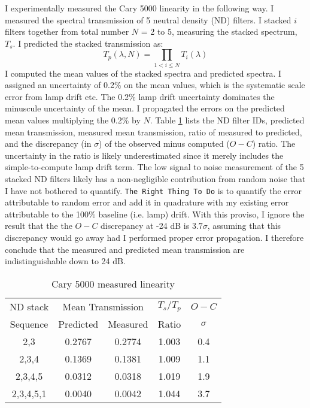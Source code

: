 I experimentally measured the Cary 5000 linearity in the following way.  I measured the spectral transmission of 5 neutral density (ND) filters.  I stacked $i$ filters together from total number $N$ = 2 to 5, measuring the stacked spectrum, $T_s$.  I predicted the stacked transmission as: $$T_{p}(\lambda, N) = \prod_{1< i \leq N} T_{i}(\lambda)$$  I computed the mean values of the stacked spectra and predicted spectra.  I assigned an uncertainty of 0.2\% on the mean values, which is the systematic scale error from lamp drift etc.  The 0.2\% lamp drift uncertainty dominates the minuscule uncertainty of the mean.  I propagated the errors on the predicted mean values multiplying the 0.2\% by $N$.  Table \ref{tab:C5000beam} lists the ND filter IDs, predicted mean transmission, measured mean transmission, ratio of measured to predicted, and the discrepancy (in $\sigma$) of the observed minus computed ($O-C$) ratio.  The uncertainty in the ratio is likely underestimated since it merely includes the simple-to-compute lamp drift term.  The low signal to noise measurement of the 5 stacked ND filters likely has a non-negligible contribution from random noise that I have not bothered to quantify.  \texttt{The Right Thing To Do\texttrademark} is to quantify the error attributable to random error and add it in quadrature with my existing error attributable to the 100\% baseline (i.e. lamp) drift.  With this proviso, I ignore the result that the the $O-C$ discrepancy at -24 dB is $3.7\sigma$, assuming that this discrepancy would go away had I performed proper error propagation.  I therefore conclude that the measured and predicted mean transmission are indistinguishable down to 24 dB.


\begin{longtable}{ccccc}
    \caption[Cary 5000 linearity]{Cary 5000 measured linearity} \label{tab:C5000beam} \\
    \hline
      ND stack &  \multicolumn{2}{c}{Mean Transmission} & $T_s/T_p$ & $O-C$ \\  \cline{2-3}
     Sequence & Predicted  &  Measured & Ratio & $\sigma$\\
         \hline
2,3		&	0.2767	&	0.2774	&	1.003	&	0.4\\
2,3,4	& 	0.1369	&	0.1381	&	1.009	&	1.1\\
2,3,4,5	& 	0.0312	&	0.0318	&	1.019	&	1.9\\
2,3,4,5,1&	0.0040	&	0.0042	&	1.044	&	3.7\\
    \hline
\end{longtable}

